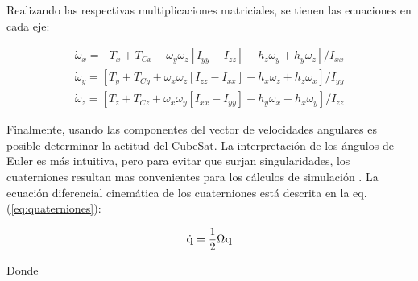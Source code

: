 \noindent Realizando las respectivas multiplicaciones matriciales, se tienen las ecuaciones en cada eje:

\begin{gather}	
	\dot{\omega}_x=\left[T_x+T_{C x}+\omega_y \omega_z\left[I_{y y}-I_{z z}\right]-h_z \omega_y+h_y \omega_z\right] / I_{x x}\label{eq:modelo_dinamico_x}\\
	\dot{\omega}_y=\left[T_y+T_{C y}+\omega_x \omega_z\left[I_{z z}-I_{x x}\right]-h_x \omega_z+h_z \omega_x\right] / I_{y y}\label{eq:modelo_dinamico_y}\\
	\dot{\omega}_z=\left[T_z+T_{C z}+\omega_x \omega_y\left[I_{x x}-I_{y y}\right]-h_y \omega_x+h_x \omega_y\right] / I_{z z}
\end{gather}




Finalmente, usando las componentes del vector de velocidades angulares es posible determinar la actitud del CubeSat. La interpretación de los ángulos de Euler es más intuitiva, pero para evitar que surjan singularidades, los cuaterniones
resultan mas convenientes para los cálculos de simulación \cite{Steyn2011}. La ecuación diferencial cinemática de los cuaterniones está descrita en la eq.(\ref{eq:quaterniones}): 

\begin{equation}\label{eq:quaterniones}
	\dot{\mathbf{q}}=\frac{1}{2} \Omega \mathbf{q} \\
\end{equation}

Donde
 
% 	

